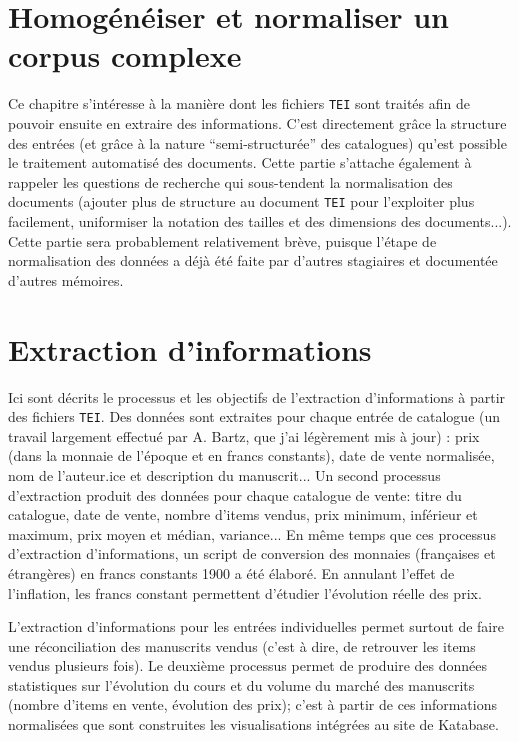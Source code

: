 \documentclass[a4paper, 12pt, twoside]{book}
\newcommand{\tei}{\texttt{TEI}}
\begin{document}
\chapter{Homogénéiser et normaliser un corpus complexe}
Ce chapitre s'intéresse à la manière dont les fichiers \tei{} sont traités afin de pouvoir ensuite en extraire des informations. C'est directement grâce la structure des entrées (et grâce à la nature \enquote{semi-structurée} des catalogues) qu'est possible le traitement automatisé des documents. Cette partie s'attache également à rappeler les questions de recherche qui sous-tendent la normalisation des documents (ajouter plus de structure au document \tei{} pour l'exploiter plus facilement, uniformiser la notation des tailles et des dimensions des documents...). Cette partie sera probablement relativement brève, puisque l'étape de normalisation des données a déjà été faite par d'autres stagiaires et documentée d'autres mémoires.


\chapter{Extraction d'informations}
Ici sont décrits le processus et les objectifs de l'extraction d'informations à partir des fichiers \tei{}. Des données sont extraites pour chaque entrée de catalogue (un travail largement effectué par A. Bartz, que j'ai légèrement mis à jour) : prix (dans la monnaie de l'époque et en francs constants), date de vente normalisée, nom de l'auteur.ice et description du manuscrit... Un second processus d'extraction produit des données pour chaque catalogue de vente: titre du catalogue, date de vente, nombre d'items vendus, prix minimum, inférieur et maximum, prix moyen et médian, variance... En même temps que ces processus d'extraction d'informations, un script de conversion des monnaies (françaises et étrangères) en francs constants 1900 a été élaboré. En annulant l'effet de l'inflation, les francs constant permettent d'étudier l'évolution réelle des prix.

L'extraction d'informations pour les entrées individuelles permet surtout de faire une réconciliation des manuscrits vendus (c'est à dire, de retrouver les items vendus plusieurs fois). Le deuxième processus permet de produire des données statistiques sur l'évolution du cours et du volume du marché des manuscrits (nombre d'items en vente, évolution des prix); c'est à partir de ces informations normalisées que sont construites les visualisations intégrées au site de Katabase.
\end{document}
